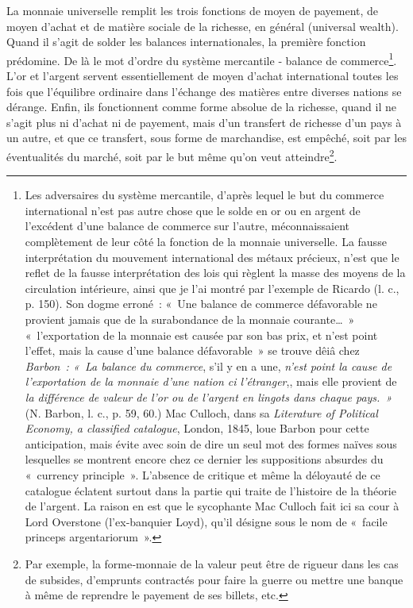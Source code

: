 \documentclass[french,twoside]{book} %
\begin{document}
La monnaie universelle remplit les trois fonctions de moyen de payement, de moyen d’achat et de matière sociale de la richesse, en général (universal wealth). Quand il s’agit de solder les balances internationales, la première fonction prédomine. De là le mot d’ordre du système mercantile ‑ balance de commerce\footnote{Les adversaires du système mercantile, d’après lequel le but du commerce international n’est pas autre chose que le solde en or ou en argent de l’excédent d’une balance de commerce sur l’autre, méconnaissaient complètement de leur côté la fonction de la monnaie universelle. La fausse interprétation du mouvement international des métaux précieux, n’est que le reflet de la fausse interprétation des lois qui règlent la masse des moyens de la circulation intérieure, ainsi que je l’ai montré par l’exemple de Ricardo (l. c., p. 150). Son dogme erroné : « Une balance de commerce défavorable ne provient jamais que de la surabondance de la monnaie courante… » « l’exportation de la monnaie est causée par son bas prix, et n’est point l’effet, mais la cause d’une balance défavorable » se trouve dêiâ chez \emph{Barbon : « La balance du commerce}, s’il y en a une, \emph{n’est point la cause de l’exportation de la monnaie d’une nation ci l’étranger},, mais elle provient de \emph{la différence de valeur de l’or ou de l’argent en lingots dans chaque pays. »} (N. Barbon, l. c., p. 59, 60.) Mac Culloch, dans sa \emph{Literature of Political Economy, a classified catalogue}, London, 1845, loue Barbon pour cette anticipation, mais évite avec soin de dire un seul mot des formes naïves sous lesquelles se montrent encore chez ce dernier les suppositions absurdes du « currency principle ». L’absence de critique et même la déloyauté de ce catalogue éclatent surtout dans la partie qui traite de l’histoire de la théorie de l’argent. La raison en est que le sycophante Mac Culloch fait ici sa cour à Lord Overstone (l’ex‑banquier Loyd), qu’il désigne sous le nom de « facile princeps argentariorum ».}. L’or et l’argent servent essentiellement de moyen d’achat international toutes les fois que l’équilibre ordinaire dans l’échange des matières entre diverses nations se dérange. Enfin, ils fonctionnent comme forme absolue de la richesse, quand il ne s’agit plus ni d’achat ni de payement, mais d’un transfert de richesse d’un pays à un autre, et que ce transfert, sous forme de marchandise, est empêché, soit par les éventualités du marché, soit par le but même qu’on veut atteindre\footnote{Par exemple, la forme‑monnaie de la valeur peut être de rigueur dans les cas de subsides, d’emprunts contractés pour faire la guerre ou mettre une banque à même de reprendre le payement de ses billets, etc.}.\par
\end{document}
